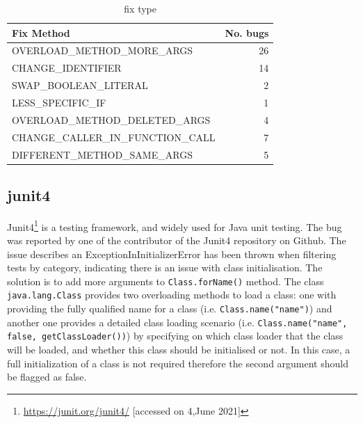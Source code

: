 \documentclass[sigconf,review,anonymous]{acmart}
\begin{document}
\begin{table}[h]
\scriptsize
\caption{fix type}
\footnotesize
\label{tab:results-fixmethod}
\begin{tabular}{|l|r|}
\hline
Fix Method                           & \multicolumn{1}{l|}{No. bugs} \\ \hline
OVERLOAD\_METHOD\_MORE\_ARGS       & 26                          \\ \hline
CHANGE\_IDENTIFIER                 & 14                          \\ \hline
SWAP\_BOOLEAN\_LITERAL             & 2                           \\ \hline
LESS\_SPECIFIC\_IF                 & 1                           \\ \hline
OVERLOAD\_METHOD\_DELETED\_ARGS    & 4                           \\ \hline
CHANGE\_CALLER\_IN\_FUNCTION\_CALL & 7                           \\ \hline
DIFFERENT\_METHOD\_SAME\_ARGS      & 5                           \\ \hline
\end{tabular}
\end{table}


\subsection{junit4}
Junit4\footnote{\url{https://junit.org/junit4/} [accessed on 4,June 2021]} is a testing framework, and widely used for Java unit testing. The bug was reported by one of the contributor of the Junit4 repository on Github. The issue describes an ExceptionInInitializerError has been thrown when filtering tests by category, indicating there is an issue with class initialisation. The solution is to add more arguments to \texttt{Class.forName()} method. The class \texttt{java.lang.Class} \cite{javaclassapi} provides two overloading methods to load a class: one with providing the fully qualified name for a class (i.e. \texttt{Class.name("name")}) and another one provides a detailed class loading scenario (i.e. \texttt{Class.name("name", false, getClassLoader())}) by specifying on which class loader that the class will be loaded, and whether this class should be initialised or not.
In this case, a full initialization of a class is not required therefore the second argument should be flagged as false.
\end{document}
